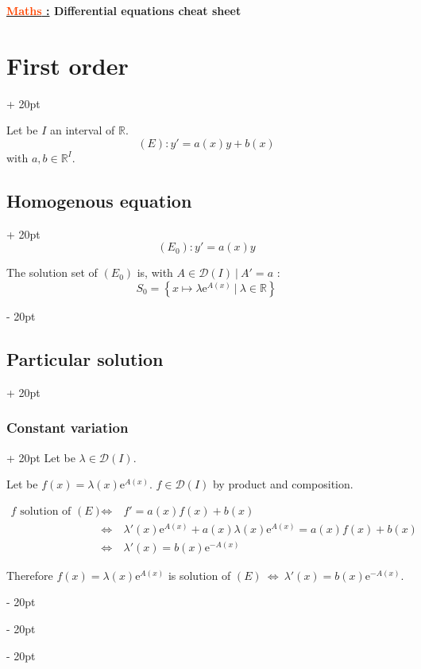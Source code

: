 \documentclass[a4paper, 12pt, twoside]{article}
\renewcommand{\emph}{\textcolor{ff4500}}
\newcommand{\R}{\mathbb{R}} %
\newcommand{\e}[1]{\mathrm{e}^{#1}}
\newcommand{\ssi}{\ \Leftrightarrow \ }
\newcommand{\lrs}[1]{\left\{ #1 \right\}}
\newcommand{\ind}[1][20pt]{\advance\leftskip + #1}
\newcommand{\deind}[1][20pt]{\advance\leftskip - #1}
\newenvironment{indentedenv}[1][20pt]{\par \ind[#1]}{\par \deind}
\newenvironment{indt}[2][20pt]{#2 \begin{indentedenv}[#1]}{\end{indentedenv}} %
\newcommand{\thetitle}[2]{\begin{center}\textbf{{\LARGE \underline{\emph{#1} :}} {\Large #2}}\end{center}}
\begin{document}
    \thetitle{Maths}{Differential equations cheat sheet}
    
    
    
    \begin{indt}{\section{First order}}
        
        Let be $I$ an interval of $\R$.
        \[ (E) : y' = a(x)y + b(x) \]
        with $a, b \in \R^I$.
        
        \begin{indt}{\subsection{Homogenous equation}}
            \[ (E_0) : y' = a(x)y \]
            
            The solution set of $(E_0)$ is, with $A \in \mathcal D(I)\ |\ A' = a$ :
            \[ S_0 = \lrs{x \longmapsto \lambda \e{A(x)}\ |\ \lambda \in \R} \]
        \end{indt}
        
        \begin{indt}{\subsection{Particular solution}}
            \begin{indt}{\subsubsection{Constant variation}}
            Let be $\lambda \in \mathcal D(I)$.
            
            Let be $f(x) = \lambda(x)\e{A(x)}$.
            $f \in \mathcal D(I)$ by product and composition.
            
            \begin{eqnarray*}
                f \text{ solution of } (E)
                &\ssi& f' = a(x)f(x) + b(x)
                \\
                &\ssi& \lambda'(x)\e{A(x)} + a(x)\lambda(x)\e{A(x)} = a(x)f(x) + b(x)
                \\
                &\ssi&\lambda'(x) = b(x) \e{-A(x)}
            \end{eqnarray*}
            
            Therefore $f(x) = \lambda(x)\e{A(x)}$ is solution of $(E) \ssi \lambda'(x) = b(x)\e{-A(x)}$.
            \end{indt}
            

\end{indt}
\end{indt}
\end{document}
